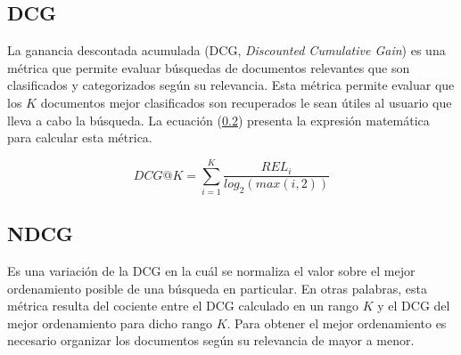 \subsection{DCG}
La ganancia descontada acumulada (DCG, \textit{Discounted Cumulative Gain}) es una métrica que permite evaluar búsquedas de documentos relevantes que son clasificados y categorizados según su relevancia. Esta métrica permite evaluar que los $K$ documentos mejor clasificados son recuperados le sean útiles al usuario que lleva a cabo la búsqueda. La ecuación (\ref{}) presenta la expresión matemática para calcular esta métrica.

\begin{equation}
    DCG@K = \sum_{i=1}^{K} \frac{REL_{i}}{log_{2}(max(i, 2))}
\end{equation}

\subsection{NDCG}
Es una variación de la DCG en la cuál se normaliza el valor sobre el mejor ordenamiento posible de una búsqueda en particular. En otras palabras, esta métrica resulta del cociente entre el DCG calculado en un rango $K$ y el DCG del mejor ordenamiento para dicho rango $K$. Para obtener el mejor ordenamiento es necesario organizar los documentos según su relevancia de mayor a menor.
